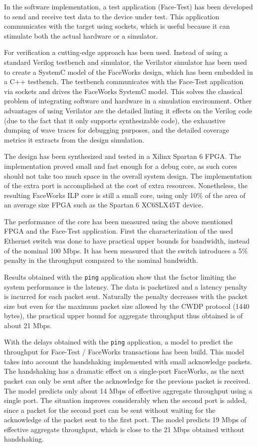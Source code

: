 \documentclass[defaultstyle,10pt,master,Helvetica]{thesis}
\begin{document}
In the software implementation, a test application (Face-Test) has been developed to send and receive test data to the device under test. This application communicates with the target using sockets, which is useful because it can stimulate both the actual hardware or a simulator. 

For verification a cutting-edge approach has been used. Instead of using a standard Verilog testbench and simulator, the Verilator simulator has been used to create a SystemC model of the FaceWorks design, which has been embedded in a C++ testbench. The testbench communicates with the Face-Test application via sockets and drives the FaceWorks SystemC model. This solves the classical problem of integrating software and hardware in a simulation environment. Other advantages of using Verilator are the detailed linting it effects on the Verilog code (due to the fact that it only supports synthesizable code), the exhaustive dumping of wave traces for debugging purposes, and the detailed coverage metrics it extracts from the design simulation. 

The design has been synthesized and tested in a Xilinx Spartan 6 \ac{FPGA}. The implementation proved small and fast enough for a debug core, as such cores should not take too much space in the overall system design. The implementation of the extra port is accomplished at the cost of extra resources. Nonetheless, the resulting FaceWorks \ac{ILP} core is still a small core, using only 10\% of the area of an average size FPGA such as the Spartan 6 XC6SLX45T device.

The performance of the core has been measured using the above mentioned FPGA and the Face-Test application. First the characterization of the used Ethernet switch was done to have practical upper bounds for bandwidth, instead of the nominal 100 Mbps. It has been measured that the switch introduces a 5\% penalty in the throughput compared to the nominal bandwidth.

Results obtained with the {\tt ping} application show that the factor limiting the system performance is the latency. The data is packetized and a latency penalty is incurred for each packet sent. Naturally the penalty decreases with the packet size but even for the maximum packet size allowed by the CWDP protocol (1440 bytes), the practical upper bound for aggregate throughput thus obtained is of about 21 Mbps.

With the delays obtained with the {\tt ping} application, a model to predict the throughput for Face-Test / FaceWorks transactions has been build. This model takes into account the handshaking implemented with small acknowledge packets. The handshaking has a dramatic effect on a single-port FaceWorks, as the next packet can only be sent after the acknowledge for the previous packet is received. The model predicts only about 14 Mbps of effective aggregate throughput using a single port. The situation improves considerably when the second port is added, since a packet for the second port can be sent without waiting for the acknowledge of the packet sent to the first port. The model predicts 19 Mbps of effective aggregate throughput, which is close to the 21 Mbps obtained without handshaking.
\end{document}
